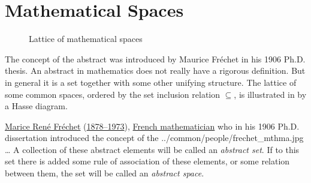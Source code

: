 \section{Mathematical Spaces}
\begin{figure}[th]
  \begin{center}
  
  \caption{Lattice of mathematical spaces\label{fig:wavfound_spaces}}
  \end{center}
\end{figure}%
The concept of the abstract  was introduced by
Maurice Fr\'echet in his 1906 Ph.D. thesis.%
An abstract  in mathematics does not really have a rigorous definition.
But in general it is a set together with some other unifying structure.
The lattice of some common spaces, ordered by the set inclusion relation $\subseteq$, 
is illustrated in  by a Hasse diagram.

\qboxnps
  {\href{http://en.wikipedia.org/wiki/Frechet}{Marice Ren\'e Fr\'echet}
   (\href{http://www-history.mcs.st-andrews.ac.uk/Timelines/TimelineF.html}{1878--1973}),
   \href{http://www-history.mcs.st-andrews.ac.uk/BirthplaceMaps/Places/France.html}{French mathematician}
   who in his 1906 Ph.D. dissertation introduced the concept of the 
   \footnotemark
  }
  {../common/people/frechet_mthma.jpg}
  {\ldots
   A collection of these abstract elements will be called an \emph{abstract set}.
   If to this set there is added some rule of association of these elements,
   or some relation between them,
   the set will be called an \emph{abstract space}.}

